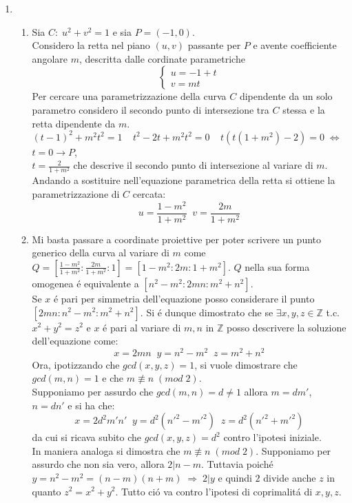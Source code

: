 \documentclass[a4paper]{article}
\newcommand{\sist}{\begin{cases}}
\newcommand{\esist}{\end{cases}}
\newcommand{\ds}{\displaystyle}
\begin{document}
\begin{enumerate}
\item 
\begin{enumerate}
\item Sia $C:\;u^2+v^2=1$ e sia $P=(-1,0)$.\\
Considero la retta nel piano $(u,v)$ passante per $P$ e avente coefficiente angolare $m$, descritta dalle cordinate parametriche
$$
\sist
u=-1+t \\
v=mt
\esist
$$
Per cercare una parametrizzazione della curva $C$ dipendente da un solo parametro considero il secondo punto di intersezione tra $C$ stessa e la retta dipendente da $m$.\\
$(t-1)^2+m^2t^2=1\;\;\;\;t^2-2t+m^2t^2=0\;\;\;\;t(t(1+m^2)-2)=0\;\Leftrightarrow$\\
$t=0\rightarrow P$,\\
$t=\ds{\frac{2}{1+m^2}}$ che descrive il secondo punto di intersezione al variare di $m$. Andando a sostituire nell'equazione parametrica della retta si ottiene la parametrizzazione di $C$ cercata:
$$u=\ds{\frac{1-m^2}{1+m^2}\;\;v=\frac{2m}{1+m^2}}$$

\item Mi basta passare a coordinate proiettive per poter scrivere un punto generico della curva al variare di $m$ come $Q=\left[\ds{\frac{1-m^2}{1+m^2}:\frac{2m}{1+m^2}:1}\right]=[1-m^2:2m:1+m^2]$.
$Q$ nella sua forma omogenea \'e equivalente a $[n^2-m^2:2mn:m^2+n^2]$.\\
Se $x$ \'e pari per simmetria dell'equazione posso considerare il punto $[2mn:n^2-m^2:m^2+n^2]$. Si \'e dunque dimostrato che se $\exists x,y,z\in\mathbb{Z}$ t.c. $x^2+y^2=z^2$ e $x$ \'e pari al variare di $m,n$ in $\mathbb{Z}$ posso descrivere la soluzione dell'equazione come:
$$x=2mn\;\;y=n^2-m^2\;\;z=m^2+n^2$$
Ora, ipotizzando che $gcd(x,y,z)=1$, si vuole dimostrare che $gcd(m,n)=1$ e che $m\not\equiv n\;(mod\;2)$.\\
Supponiamo per assurdo che $gcd(m,n)=d\neq 1$ allora $m=dm'$, $n=dn'$ e si ha che:
$$x=2d^2m'n'\;\;y=d^2(n'^2-m'^2)\;\;z=d^2(n'^2+m'^2)$$
da cui si ricava subito che $gcd(x,y,z)=d^2$ contro l'ipotesi iniziale.\\
In maniera analoga si dimostra che $m\not\equiv n\;(mod\;2)$. Supponiamo per assurdo che non sia vero, allora $2|n-m$. Tuttavia poich\'e $y=n^2-m^2=(n-m)(n+m)\;\Rightarrow\;2|y$ e quindi $2$ divide anche $z$ in quanto $z^2=x^2+y^2$. Tutto ci\'o va contro l'ipotesi di coprimalit\'a di $x,y,z$.\\
\end{enumerate}



\end{enumerate}
\end{document}
